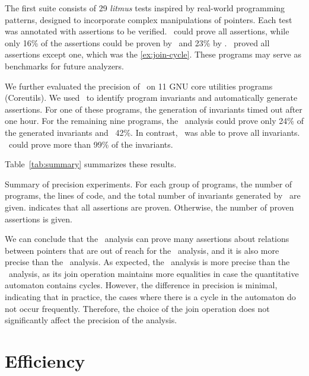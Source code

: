 The first suite consists of 29 \emph{litmus} tests inspired by real-world programming patterns,
designed to incorporate complex manipulations of pointers.
Each test was annotated with assertions to be verified.
\cpou\ could prove all assertions,
while only 16\% of the assertions could be proven by \base\ and 23\% by \vareq.
\cpod\ proved all assertions except one, which was the \cref{ex:join-cycle}.
These programs may serve as benchmarks for future analyzers.

We further evaluated the precision of \cpo\ on 11 GNU core utilities programs (Coreutils).
We used \cpou\ to identify program invariants and automatically generate assertions.
For one of these programs, the generation of invariants timed out after one hour.
For the remaining nine programs, the \base\ analysis could prove only 24\% of the generated invariants
and \vareq\ 42\%.
In contrast, \cpou\ was able to prove all invariants.
\cpod\ could prove more than 99\% of the invariants.

Table~\ref{tab:summary} summarizes these results.

\begin{table}[t]
    \centering
    \caption[Results of experiments on litmus tests and Coreutils.]{Summary of precision experiments. For each group of programs, the number of programs, the lines of code, and the total number of invariants generated by \cpou\ are given.
         indicates that all assertions are proven. Otherwise, the number of proven assertions is given.}\label{tab:summary}
    
\end{table}

We can conclude that the \cpo\ analysis can prove many assertions about relations between pointers that are out of reach for the \base\ analysis, and it is also more precise than the \vareq\ analysis.
As expected, the \cpou\ analysis is more precise than the \cpod\ analysis, as its join operation maintains more equalities in case the quantitative automaton contains cycles.
However, the difference in precision is minimal, indicating that in practice, the cases where there is a cycle in the automaton do not occur frequently.
Therefore, the choice of the join operation does not significantly affect the precision of the analysis.

\section{Efficiency}

